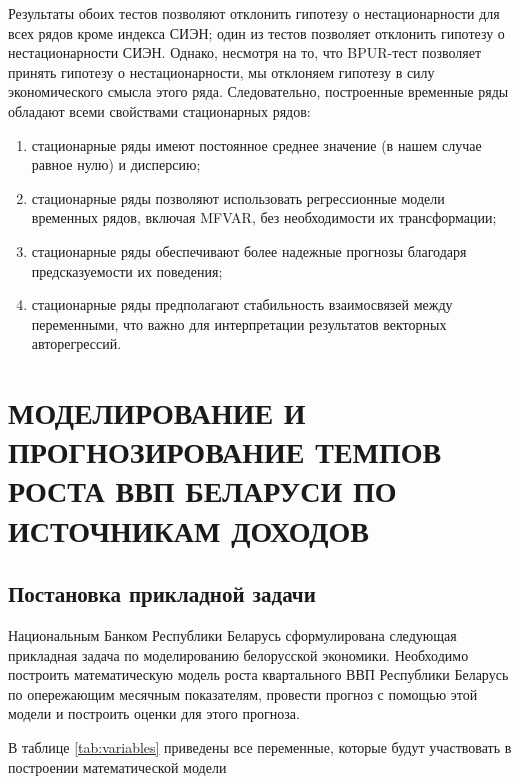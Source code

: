 \documentclass[a4paper, 14pt]{extreport}
\numberwithin{equation}{section}
\numberwithin{equation}{section}
\begin{document}
	
	Результаты обоих тестов позволяют отклонить гипотезу о нестационарности для всех рядов кроме индекса СИЭН; один из тестов позволяет отклонить гипотезу о нестационарности СИЭН. Однако, несмотря на то, что BPUR-тест позволяет принять гипотезу о нестационарности, мы отклоняем гипотезу в силу экономического смысла этого ряда. Следовательно, построенные временные ряды обладают всеми свойствами стационарных рядов:
	\begin{enumerate}
		\item стационарные ряды имеют постоянное среднее значение (в нашем случае равное нулю) и дисперсию;
		\item стационарные ряды позволяют использовать регрессионные модели временных рядов, включая MFVAR, без необходимости их трансформации;
		\item стационарные ряды обеспечивают более надежные прогнозы благодаря предсказуемости их поведения;
		\item стационарные ряды предполагают стабильность взаимосвязей между переменными, что важно для интерпретации результатов векторных авторегрессий.
	\end{enumerate}
	
	\newpage
	
	\chapter{МОДЕЛИРОВАНИЕ И ПРОГНОЗИРОВАНИЕ ТЕМПОВ РОСТА ВВП БЕЛАРУСИ ПО ИСТОЧНИКАМ ДОХОДОВ}
	\section{Постановка прикладной задачи}
	Национальным Банком Республики Беларусь сформулирована следующая прикладная задача по моделированию белорусской экономики. Необходимо построить математическую модель роста квартального ВВП Республики Беларусь по опережающим месячным показателям, провести прогноз с помощью этой модели и построить оценки для этого прогноза. 
	
	В таблице \ref{tab:variables} приведены все переменные, которые будут участвовать в построении математической модели
	
\end{document}
